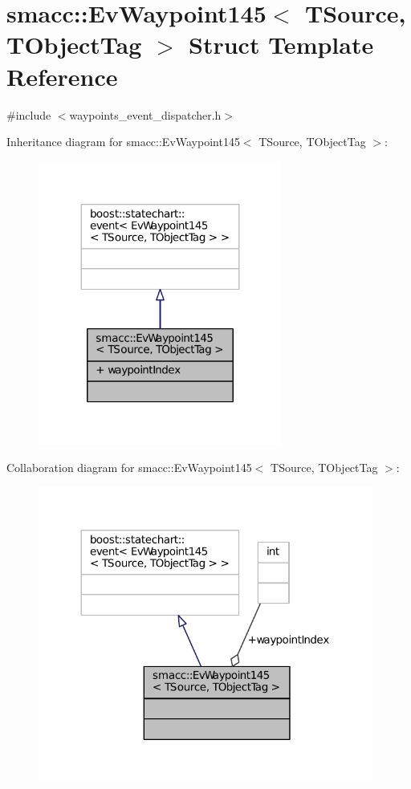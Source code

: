\hypertarget{structsmacc_1_1EvWaypoint145}{}\section{smacc\+:\+:Ev\+Waypoint145$<$ T\+Source, T\+Object\+Tag $>$ Struct Template Reference}
\label{structsmacc_1_1EvWaypoint145}


{\ttfamily \#include $<$waypoints\+\_\+event\+\_\+dispatcher.\+h$>$}



Inheritance diagram for smacc\+:\+:Ev\+Waypoint145$<$ T\+Source, T\+Object\+Tag $>$\+:
\nopagebreak
\begin{figure}[H]
\begin{center}
\leavevmode
\includegraphics[width=227pt]{structsmacc_1_1EvWaypoint145__inherit__graph}
\end{center}
\end{figure}


Collaboration diagram for smacc\+:\+:Ev\+Waypoint145$<$ T\+Source, T\+Object\+Tag $>$\+:
\nopagebreak
\begin{figure}[H]
\begin{center}
\leavevmode
\includegraphics[width=312pt]{structsmacc_1_1EvWaypoint145__coll__graph}
\end{center}
\end{figure}
